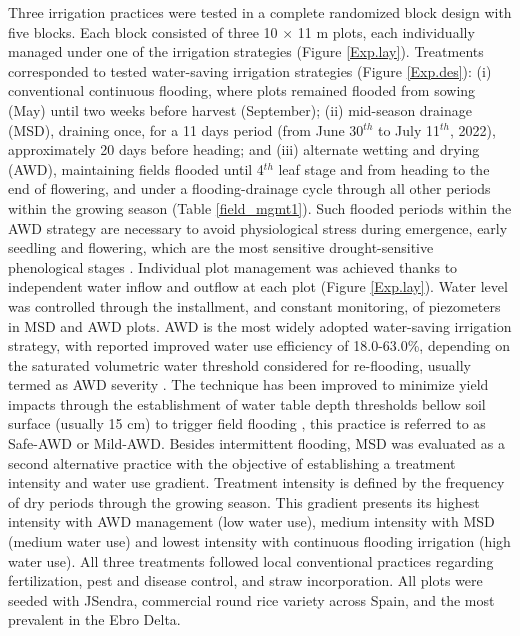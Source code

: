 Three irrigation practices were tested in a complete randomized block design with five blocks. Each block consisted of three 10 $\times$ 11 m plots, each individually managed under one of the irrigation strategies (Figure \ref{Exp.lay}). Treatments corresponded to tested water-saving irrigation strategies (Figure \ref{Exp.des}): (i) conventional continuous flooding, where plots remained flooded from sowing (May) until two weeks before harvest (September); (ii) mid-season drainage (MSD), draining once, for a 11 days period (from June 30$^{th}$ to July 11$^{th}$, 2022), approximately 20 days before heading; and (iii) alternate wetting and drying (AWD), maintaining fields flooded until 4$^{th}$ leaf stage and from heading to the end of flowering, and under a flooding-drainage cycle through all other periods within the growing season (Table \ref{field_mgmt1}). Such flooded periods within the AWD strategy are necessary to avoid physiological stress during emergence, early seedling  and flowering, which are the most sensitive drought-sensitive phenological stages \citep{singh2017developing, yang2019different}. Individual plot management was achieved thanks to independent water inflow and outflow at each plot (Figure \ref{Exp.lay}). Water level was controlled through the installment, and constant monitoring, of piezometers in MSD and AWD plots. AWD is the most widely adopted water-saving irrigation strategy, with reported improved water use efficiency of 18.0-63.0\%, depending on the saturated volumetric water threshold considered for re-flooding, usually termed as AWD severity \citep{linquist2015}. The technique has been improved to minimize yield impacts through the establishment of water table depth thresholds bellow soil surface (usually 15 cm) to trigger field flooding \citep{carrijo2017}, this practice is referred to as Safe-AWD or Mild-AWD. Besides intermittent flooding, MSD was evaluated as a second alternative practice with the objective of establishing a treatment intensity and water use gradient. Treatment intensity is defined by the frequency of dry periods through the growing season. This gradient presents its highest intensity with AWD management (low water use), medium intensity with MSD (medium water use) and lowest intensity with continuous flooding irrigation (high water use). All three treatments followed local conventional practices regarding fertilization, pest and disease control, and straw incorporation. All plots were seeded with JSendra, commercial round rice variety across Spain, and the most prevalent in the Ebro Delta.\\

